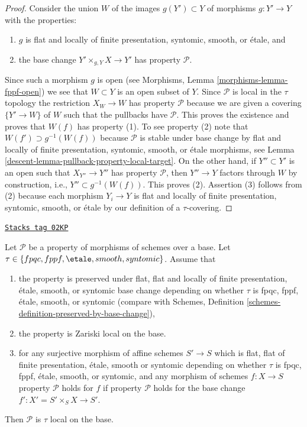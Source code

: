 \begin{proof}

Consider the union $W$ of the images $g(Y') \subset Y$ of
morphisms $g : Y' \to Y$ with the properties:
\begin{enumerate}
\item $g$ is flat and locally of finite presentation, syntomic,
smooth, or \'etale, and
\item the base change $Y' \times_{g, Y} X \to Y'$ has property
$\mathcal{P}$.
\end{enumerate}
Since such a morphism $g$ is open (see
Morphisms, Lemma \ref{morphisms-lemma-fppf-open})
we see that $W \subset Y$ is an open subset of $Y$. Since $\mathcal{P}$
is local in the $\tau$ topology the restriction $X_W \to W$ has property
$\mathcal{P}$ because we are given a covering $\{Y' \to W\}$ of $W$ such that
the pullbacks have $\mathcal{P}$. This proves the existence and proves
that $W(f)$ has property (1). To see property (2) note that
$W(f') \supset g^{-1}(W(f))$ because $\mathcal{P}$ is stable under
base change by flat and locally of finite presentation,
syntomic, smooth, or \'etale morphisms, see
Lemma \ref{descent-lemma-pullback-property-local-target}.
On the other hand, if $Y'' \subset Y'$ is an open such that
$X_{Y''} \to Y''$ has property $\mathcal{P}$, then $Y'' \to Y$ factors
through $W$ by construction, i.e., $Y'' \subset g^{-1}(W(f))$. This
proves (2). Assertion (3) follows from (2) because each morphism
$Y_i \to Y$ is flat and locally of finite presentation, syntomic,
smooth, or \'etale by our definition of a $\tau$-covering.
\end{proof}

\begin{lemma}
\label{descent-lemma-descending-properties-morphisms}
\href{https://stacks.math.columbia.edu/tag/02KP}{\texttt{Stacks tag 02KP}}

Let $\mathcal{P}$ be a property of morphisms of schemes over a base.
Let $\tau \in \{fpqc, fppf, \etale, smooth, syntomic\}$.
Assume that
\begin{enumerate}
\item the property is preserved under
flat, flat and locally of finite presentation, \'etale, smooth, or syntomic
base change depending on whether $\tau$ is fpqc, fppf, \'etale, smooth, or
syntomic (compare with
Schemes, Definition \ref{schemes-definition-preserved-by-base-change}),
\item the property is Zariski local on the base.
\item for any surjective morphism of affine schemes $S' \to S$
which is flat, flat of finite presentation,
\'etale, smooth or syntomic depending on whether $\tau$ is
fpqc, fppf, \'etale, smooth, or syntomic,
and any morphism of schemes $f : X \to S$ property
$\mathcal{P}$ holds for $f$ if property $\mathcal{P}$
holds for the base change $f' : X' = S' \times_S X \to S'$.
\end{enumerate}
Then $\mathcal{P}$ is $\tau$ local on the base.
\end{lemma}

